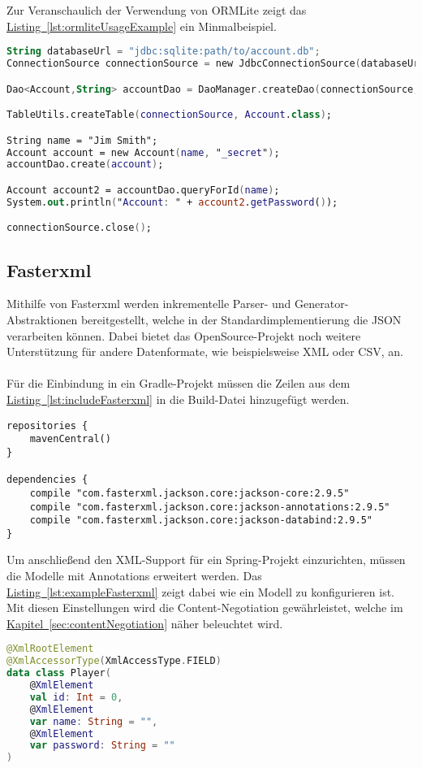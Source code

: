 Zur Veranschaulich der Verwendung von ORMLite zeigt das \hyperref[lst:ormliteUsageExample]{Listing~\ref{lst:ormliteUsageExample}} ein Minmalbeispiel.
\begin{lstlisting}[style=lstStyleFramed, language=Kotlin, caption={Beispiel: Verwendung von ORMLite (verändert nach \cite{ormlite})}, label=lst:ormliteUsageExample, float]
String databaseUrl = "jdbc:sqlite:path/to/account.db";
ConnectionSource connectionSource = new JdbcConnectionSource(databaseUrl);

Dao<Account,String> accountDao = DaoManager.createDao(connectionSource, Account.class);

TableUtils.createTable(connectionSource, Account.class);

String name = "Jim Smith";
Account account = new Account(name, "_secret");
accountDao.create(account);

Account account2 = accountDao.queryForId(name);
System.out.println("Account: " + account2.getPassword());

connectionSource.close();
\end{lstlisting}

\subsection{Fasterxml}\label{sec:bibfasterxml}
Mithilfe von Fasterxml werden inkrementelle Parser- und Generator-Abstraktionen bereitgestellt, welche in der Standardimplementierung die \gls{JSON} verarbeiten können. Dabei bietet das OpenSource-Projekt noch weitere Unterstützung für andere Datenformate, wie beispielsweise \gls{XML} oder \gls{CSV}, an.\cite{fasterxml}\\
\\
Für die Einbindung in ein Gradle-Projekt müssen die Zeilen aus dem \hyperref[lst:includeFasterxml]{Listing~\ref{lst:includeFasterxml}} in die Build-Datei hinzugefügt werden.
\begin{lstlisting}[style=lstStyleFramed, language=Gradle, caption={Einbindung der Bibliothek Fasterxml mithilfe von Gradle}, label=lst:includeFasterxml, float]
repositories {
	mavenCentral()
}

dependencies {
	compile "com.fasterxml.jackson.core:jackson-core:2.9.5"
	compile "com.fasterxml.jackson.core:jackson-annotations:2.9.5"
	compile "com.fasterxml.jackson.core:jackson-databind:2.9.5"
}
\end{lstlisting}
Um anschließend den \gls{XML}-Support für ein Spring-Projekt einzurichten, müssen die Modelle mit Annotations erweitert werden. Das \hyperref[lst:exampleFasterxml]{Listing~\ref{lst:exampleFasterxml}} zeigt dabei wie ein Modell zu konfigurieren ist. Mit diesen Einstellungen wird die Content-Negotiation gewährleistet, welche im \hyperref[sec:contentNegotiation]{Kapitel~\ref{sec:contentNegotiation}} näher beleuchtet wird.
\begin{lstlisting}[style=lstStyleFramed, language=Kotlin, caption={Beispiel: Verwendung von Fasterxml}, label=lst:exampleFasterxml, float]
@XmlRootElement
@XmlAccessorType(XmlAccessType.FIELD)
data class Player(
	@XmlElement
	val id: Int = 0,
	@XmlElement
	var name: String = "",
	@XmlElement
	var password: String = ""
)
\end{lstlisting} 

